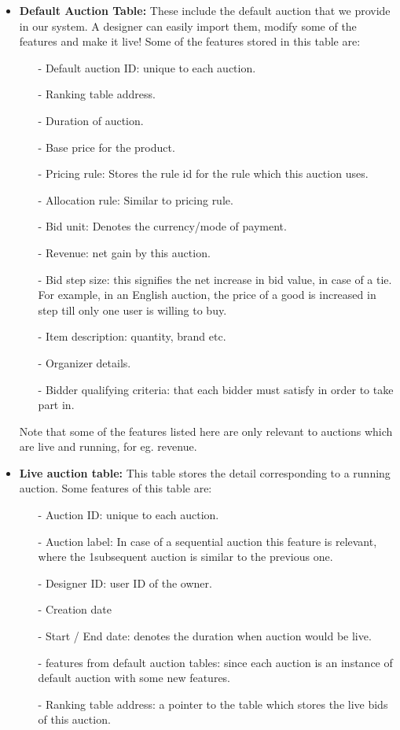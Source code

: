 \documentclass[a4paper]{article}
\begin{document}
\begin{itemize}
    \item \textbf{Default Auction Table:} These include the default auction that we provide in our system. A designer can easily import them, modify some of the features and make it live! Some of the features stored in this table are:
    \begin{itemize}
        \item[-] Default auction ID: unique to each auction.
        \item[-] Ranking table address. 
        \item[-] Duration of auction.
        \item[-] Base price for the product.
        \item[-] Pricing rule: Stores the rule id for the rule which this auction uses.
        \item[-] Allocation rule: Similar to pricing rule.
        \item[-] Bid unit: Denotes the currency/mode of payment.
        \item[-] Revenue: net gain by this auction.
        \item[-] Bid step size: this signifies the net increase in bid value, in case of a tie. For example, in an English auction, the price of a good is increased in step till only one user is willing to buy.
        \item[-] Item description: quantity, brand etc.
        \item[-] Organizer details.
        \item[-] Bidder qualifying criteria: that each bidder must satisfy in order to take part in.
    \end{itemize}
    Note that some of the features listed here are only relevant to auctions which are live and running, for eg. revenue.
    \item \textbf{Live auction table:} This table stores the detail corresponding to a running auction. Some features of this table are:
    \begin{itemize}
        \item[-] Auction ID: unique to each auction.
        \item[-] Auction label: In case of a sequential auction this feature is relevant, where the 1subsequent auction is similar to the previous one.
        \item[-] Designer ID: user ID of the owner.
        \item[-] Creation date
        \item[-] Start / End date: denotes the duration when auction would be live.
        \item[-] features from default auction tables: since each auction is an instance of default auction with some new features.
        \item[-] Ranking table address: a pointer to the table which stores the live bids of this auction.
    \end{itemize}


\end{itemize}
\end{document}
